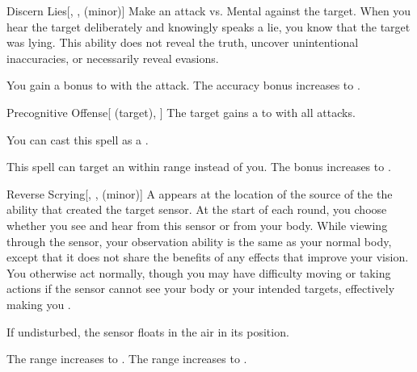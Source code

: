 \lowercase{\hypertarget{spell:Discern Lies}{}}\label{spell:Discern Lies}
\begin{freeability}[Rank 3]{\hypertarget{spell:Discern Lies}{Discern Lies}}[, ,  (minor)]
Make an attack vs. Mental against the target.
\hit When you hear the target deliberately and knowingly speaks a lie, you know that the target was lying.
This ability does not reveal the truth, uncover unintentional inaccuracies, or necessarily reveal evasions.

\rankline
{} You gain a  bonus to  with the attack.
 The accuracy bonus increases to .

\end{freeability}
\vspace{0.25em}



\lowercase{\hypertarget{spell:Precognitive Offense}{}}\label{spell:Precognitive Offense}
\begin{attuneability}[Rank 3]{\hypertarget{spell:Precognitive Offense}{Precognitive Offense}}[ (target), ]
The target gains a   to  with all attacks.

You can cast this spell as a .

\rankline
{} This spell can target an  within \rngmed range instead of you.
 The bonus increases to .

\end{attuneability}
\vspace{0.25em}



\lowercase{\hypertarget{spell:Reverse Scrying}{}}\label{spell:Reverse Scrying}
\begin{freeability}[Rank 3]{\hypertarget{spell:Reverse Scrying}{Reverse Scrying}}[, ,  (minor)]
A  appears at the location of the source of the the ability that created the target sensor.
At the start of each round, you choose whether you see and hear from this sensor or from your body.
While viewing through the sensor, your observation ability is the same as your normal body, except that it does not share the benefits of any  effects that improve your vision.
You otherwise act normally, though you may have difficulty moving or taking actions if the sensor cannot see your body or your intended targets, effectively making you \blinded.

If undisturbed, the sensor floats in the air in its position.

\rankline
{} The range increases to \rnglong.
 The range increases to \rngext.

\end{freeability}
\vspace{0.25em}




